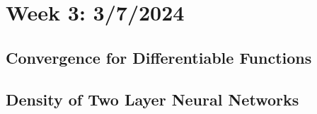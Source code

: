\section{Week 3: 3/7/2024}
\subsection{Convergence for Differentiable Functions}

\subsection{Density of Two Layer Neural Networks}
